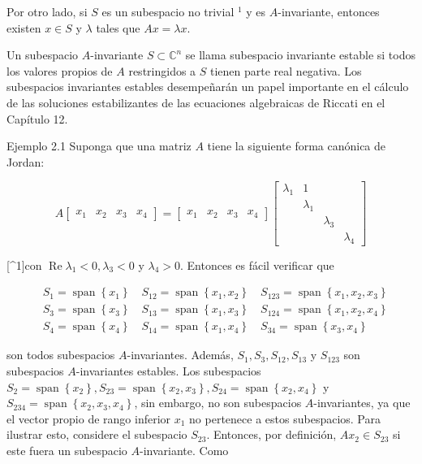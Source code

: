 \documentclass[11pt]{article}
\begin{document}
Por otro lado, si $S$ es un subespacio no trivial ${ }^{1}$ y es $A$-invariante, entonces existen $x \in S$ y $\lambda$ tales que $A x=\lambda x$.

Un subespacio $A$-invariante $S \subset \mathbb{C}^{n}$ se llama subespacio invariante estable si todos los valores propios de $A$ restringidos a $S$ tienen parte real negativa. Los subespacios invariantes estables desempeñarán un papel importante en el cálculo de las soluciones estabilizantes de las ecuaciones algebraicas de Riccati en el Capítulo 12.

Ejemplo 2.1 Suponga que una matriz $A$ tiene la siguiente forma canónica de Jordan:

$$
A\left[\begin{array}{llll}
x_{1} & x_{2} & x_{3} & x_{4}
\end{array}\right]=\left[\begin{array}{llll}
x_{1} & x_{2} & x_{3} & x_{4}
\end{array}\right]\left[\begin{array}{cccc}
\lambda_{1} & 1 & & \\
& \lambda_{1} & & \\
& & \lambda_{3} & \\
& & & \lambda_{4}
\end{array}\right]
$$

[\^{}1]con $\operatorname{Re} \lambda_{1}<0, \lambda_{3}<0$ y $\lambda_{4}>0$. Entonces es fácil verificar que

$$
\begin{aligned}
& S_{1}=\operatorname{span}\left\{x_{1}\right\} \quad S_{12}=\operatorname{span}\left\{x_{1}, x_{2}\right\} \quad S_{123}=\operatorname{span}\left\{x_{1}, x_{2}, x_{3}\right\} \\
& S_{3}=\operatorname{span}\left\{x_{3}\right\} \quad S_{13}=\operatorname{span}\left\{x_{1}, x_{3}\right\} \quad S_{124}=\operatorname{span}\left\{x_{1}, x_{2}, x_{4}\right\} \\
& S_{4}=\operatorname{span}\left\{x_{4}\right\} \quad S_{14}=\operatorname{span}\left\{x_{1}, x_{4}\right\} \quad S_{34}=\operatorname{span}\left\{x_{3}, x_{4}\right\}
\end{aligned}
$$

son todos subespacios $A$-invariantes. Además, $S_{1}, S_{3}, S_{12}, S_{13}$ y $S_{123}$ son subespacios $A$-invariantes estables. Los subespacios $S_{2}=\operatorname{span}\left\{x_{2}\right\}, S_{23}=\operatorname{span}\left\{x_{2}, x_{3}\right\}, S_{24}=\operatorname{span}\left\{x_{2}, x_{4}\right\}$ y $S_{234}=\operatorname{span}\left\{x_{2}, x_{3}, x_{4}\right\}$, sin embargo, no son subespacios $A$-invariantes, ya que el vector propio de rango inferior $x_{1}$ no pertenece a estos subespacios. Para ilustrar esto, considere el subespacio $S_{23}$. Entonces, por definición, $A x_{2} \in S_{23}$ si este fuera un subespacio $A$-invariante. Como
\end{document}
